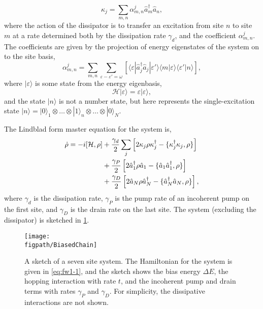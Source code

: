 \begin{equation}
	\kappa_{j} = \sum_{m,n} \alpha_{m,n}^{j} \hat{a}_{m}^{\dagger}\hat{a}_{n},
	\label{eq:fw1-5}
\end{equation}
where the action of the dissipator is to transfer an excitation from site \(n\) to site \(m\) at a rate determined both by the dissipation rate \(\gamma_{d}\), and the coefficient \(\alpha_{m,n}^{j}\). The coefficients are given by the projection of energy eigenstates of the system on to the site basis,
\begin{equation}
	\alpha_{m,n}^{j} = \sum_{m,n} \sum_{\varepsilon - \varepsilon' = \omega} \left[ \langle \varepsilon | \hat{a}_{j}^{\dagger}\hat{a}_{j} | \varepsilon' \rangle \langle m |\varepsilon \rangle \langle \varepsilon' | n \rangle \right], 
	\label{eq:fw1-6}
\end{equation}
where \(|\varepsilon \rangle\) is some state from the energy eigenbasis,
\begin{equation}
	\mathcal{H}|\varepsilon \rangle = \varepsilon|\varepsilon\rangle,
	\label{eq:fw1-7}
\end{equation}
and the state \(|n\rangle\) is not a number state, but here represents the single-excitation state \(|n \rangle = | 0 \rangle_{1} \otimes \ldots \otimes | 1 \rangle_{n} \otimes \ldots \otimes |0 \rangle_{N}\). 

The Lindblad form master equation for the system is, 
\begin{align}
	\dot{\rho} = -i[\mathcal{H}, \rho] &+ \frac{\gamma_{d}}{2} \sum_{j} \left[2\kappa_{j}\rho\kappa_{j}^{\dagger} - \{\kappa_{j}^{\dagger}\kappa_{j}, \rho\}\right] \notag \\
	&+ \frac{\gamma_{P}}{2}\left[2\hat{a}_{1}^{\dagger}\rho\hat{a}_{1} - \{\hat{a}_{1}\hat{a}_{1}^{\dagger}, \rho\}\right] \notag \\
	&+ \frac{\gamma_{D}}{2}\left[2\hat{a}_{N}\rho\hat{a}_{N}^{\dagger} - \{\hat{a}_{N}^{\dagger}\hat{a}_{N}, \rho\}\right],
	\label{eq:fw1-2}
\end{align}
where \(\gamma_{d}\) is the dissipation rate, \(\gamma_{P}\) is the pump rate of an incoherent pump on the first site, and \(\gamma_{D}\) is the drain rate on the last site. The system (excluding the dissipator) is sketched in \cref{fig:fw1-1}.

\begin{figure}[ht!]
	\centering
	\texttt{[image: \\figpath/BiasedChain]}
	\caption{\label{fig:fw1-1}A sketch of a seven site system. The Hamiltonian for the system is given in \cref{eq:fw1-1}, and the sketch shows the bias energy \(\Delta E\), the hopping interaction with rate \(t\), and the incoherent pump and drain terms with rates \(\gamma_{P}\) and \(\gamma_{D}\). For simplicity, the dissipative interactions are not shown.}
\end{figure}


